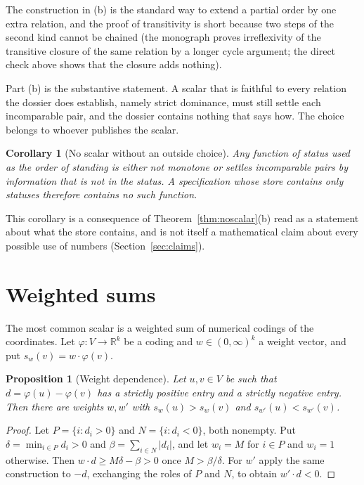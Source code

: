 \documentclass[11pt]{article}
\theoremstyle{plain}
\newtheorem{proposition}[theorem]{Proposition}
\newtheorem{corollary}[theorem]{Corollary}
\theoremstyle{definition}
\theoremstyle{remark}
\newcommand{\R}{\mathbb R}
\begin{document}
The construction in (b) is the standard way to extend a partial order by one extra relation, and the proof of transitivity is short because two steps of the second kind cannot be chained (the monograph proves irreflexivity of the transitive closure of the same relation by a longer cycle argument; the direct check above shows that the closure adds nothing).


Part (b) is the substantive statement. A scalar that is faithful to every relation the dossier does establish, namely strict dominance, must still settle each incomparable pair, and the dossier contains nothing that says how. The choice belongs to whoever publishes the scalar.

\begin{corollary}[No scalar without an outside choice]\label{cor:norank}
Any function of status used as the order of standing is either not monotone or settles incomparable pairs by information that is not in the status. A specification whose store contains only statuses therefore contains no such function.
\end{corollary}

This corollary is a consequence of Theorem~\ref{thm:noscalar}(b) read as a statement about what the store contains, and is not itself a mathematical claim about every possible use of numbers (Section~\ref{sec:claims}).

\section{Weighted sums}\label{sec:weights}

The most common scalar is a weighted sum of numerical codings of the coordinates. Let $\varphi:V\to\R^k$ be a coding and $w\in(0,\infty)^k$ a weight vector, and put $s_w(v)=w\cdot\varphi(v)$.

\begin{proposition}[Weight dependence]\label{prop:weights}
Let $u,v\in V$ be such that $d=\varphi(u)-\varphi(v)$ has a strictly positive entry and a strictly negative entry. Then there are weights $w,w'$ with $s_w(u)>s_w(v)$ and $s_{w'}(u)<s_{w'}(v)$.
\end{proposition}

\begin{proof}
Let $P=\{i:d_i>0\}$ and $N=\{i:d_i<0\}$, both nonempty. Put $\delta=\min_{i\in P}d_i>0$ and $\beta=\sum_{i\in N}|d_i|$, and let $w_i=M$ for $i\in P$ and $w_i=1$ otherwise. Then $w\cdot d\ge M\delta-\beta>0$ once $M>\beta/\delta$. For $w'$ apply the same construction to $-d$, exchanging the roles of $P$ and $N$, to obtain $w'\cdot d<0$.
\end{proof}
\end{document}
